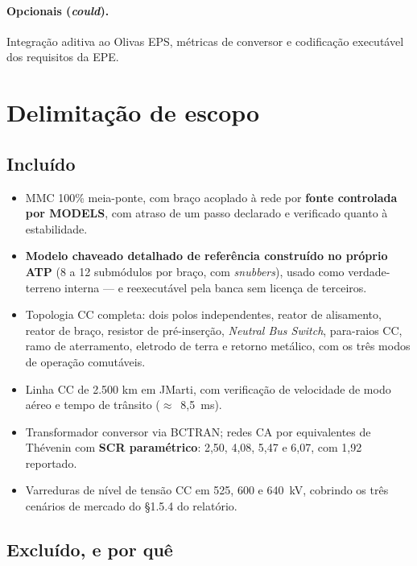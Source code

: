 \documentclass[12pt,a4paper]{article}
\begin{document}
\paragraph{Opcionais (\emph{could}).}
Integração aditiva ao Olivas EPS, métricas de conversor e codificação executável dos requisitos da
EPE.

\section{Delimitação de escopo}

\subsection{Incluído}

\begin{itemize}
  \item MMC 100\% meia-ponte, com braço acoplado à rede por \textbf{fonte controlada por MODELS},
        com atraso de um passo declarado e verificado quanto à estabilidade.
  \item \textbf{Modelo chaveado detalhado de referência construído no próprio ATP} (8 a 12
        submódulos por braço, com \emph{snubbers}), usado como verdade-terreno interna --- e
        reexecutável pela banca sem licença de terceiros.
  \item Topologia CC completa: dois polos independentes, reator de alisamento, reator de braço,
        resistor de pré-inserção, \emph{Neutral Bus Switch}, para-raios CC, ramo de aterramento,
        eletrodo de terra e retorno metálico, com os três modos de operação comutáveis.
  \item Linha CC de 2.500 km em JMarti, com verificação de velocidade de modo aéreo e tempo de
        trânsito ($\approx$~8,5~ms).
  \item Transformador conversor via BCTRAN; redes CA por equivalentes de Thévenin com \textbf{SCR
        paramétrico}: 2,50, 4,08, 5,47 e 6,07, com 1,92 reportado.
  \item Varreduras de nível de tensão CC em 525, 600 e 640~kV, cobrindo os três cenários de mercado
        do \S1.5.4 do relatório.
\end{itemize}

\subsection{Excluído, e por quê}
\end{document}
